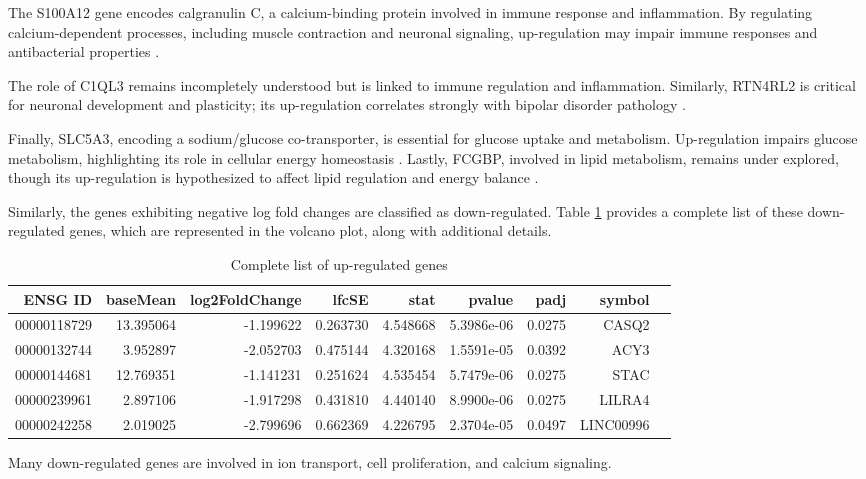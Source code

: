 \documentclass{article}
\begin{document}
The S100A12 gene encodes calgranulin C, a calcium-binding protein involved in immune response and inflammation. By regulating calcium-dependent processes, including muscle contraction and neuronal signaling, up-regulation may impair immune responses and antibacterial properties \cite{Foell2007S100}.

The role of C1QL3 remains incompletely understood but is linked to immune regulation and inflammation. Similarly, RTN4RL2 is critical for neuronal development and plasticity; its up-regulation correlates strongly with bipolar disorder pathology \cite{Smith2019Neurodevelopment}.

Finally, SLC5A3, encoding a sodium/glucose co-transporter, is essential for glucose uptake and metabolism. Up-regulation impairs glucose metabolism, highlighting its role in cellular energy homeostasis \cite{Chen2019SLC5A}. Lastly, FCGBP, involved in lipid metabolism, remains under explored, though its up-regulation is hypothesized to affect lipid regulation and energy balance \cite{Kim2020Lipids}.

Similarly, the genes exhibiting negative log fold changes are classified as down-regulated. Table \ref{table:down_regulated} provides a complete list of these down-regulated genes, which are represented in the volcano plot, along with additional details.

\begin{table}[H]
    \centering
    \begin{tabular}{rrrrrrrrl}
    \toprule
    ENSG ID & baseMean & log2FoldChange & lfcSE & stat & pvalue & padj & symbol \\
    \midrule
    00000118729 & 13.395064 & -1.199622 & 0.263730 & 4.548668 & 5.3986e-06 & 0.0275 & CASQ2 \\
    00000132744 & 3.952897 & -2.052703 & 0.475144 & 4.320168 & 1.5591e-05 & 0.0392 & ACY3 \\
    00000144681 & 12.769351 & -1.141231 & 0.251624 & 4.535454 & 5.7479e-06 & 0.0275 & STAC \\
    00000239961 & 2.897106 & -1.917298 & 0.431810 & 4.440140 & 8.9900e-06 & 0.0275 & LILRA4 \\
    00000242258 & 2.019025 & -2.799696 & 0.662369 & 4.226795 & 2.3704e-05 & 0.0497 & LINC00996 \\
    \bottomrule
    \end{tabular}
    \caption{Complete list of up-regulated genes}
    \label{table:down_regulated}
\end{table}
Many down-regulated genes are involved in ion transport, cell proliferation, and calcium signaling. 
\end{document}
